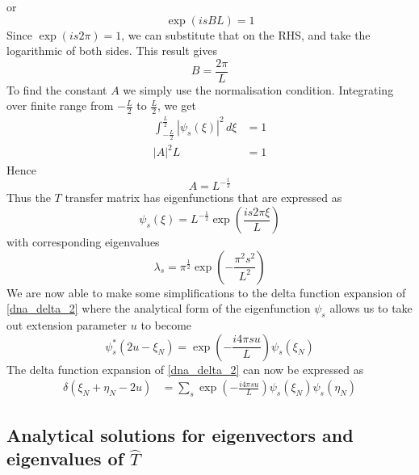 %
or
%
\begin{equation}
\exp\left(isBL\right)=1
\end{equation}
%
Since $\exp\left(is2\pi\right)=1$, we can substitute that on the RHS, and take the logarithmic of both sides. This result gives
%
\begin{equation}
\label{ana_s_sol_const_B}
B=\frac{2\pi}{L}
\end{equation}
%
To find the constant $A$ we simply use the normalisation condition. Integrating over finite range from $-\frac{L}{2}$ to $\frac{L}{2}$, we get
%
\begin{align}
\label{ana_s_sol_norm}
\int_{-\frac{L}{2}}^{\frac{L}{2}}|\psi_{s}\left(\xi\right)|^{2}\,d\xi&=1\\
|A|^{2}L&=1
\end{align}
%
Hence
\begin{equation}
\label{ana_s_sol_const_A}
A=L^{-\frac{1}{2}}
\end{equation}
%
Thus the $T$ transfer matrix has eigenfunctions that are expressed as
%
\begin{equation}
\label{dna_T_eigenfunction}
\psi_{s}\left(\xi\right)=L^{-\frac{1}{2}}\exp\left(\frac{i s 2\pi\xi}{L}\right)
\end{equation}
%
with corresponding eigenvalues
%
\begin{equation}
\label{dna_T_eigenvalue}
\lambda_{s}=\pi^{\frac{1}{2}}\exp\left(-\frac{\pi^{2} s^{2}}{L^{2}}\right)
\end{equation}
%
We are now able to make some simplifications to the delta function expansion of \eqref{dna_delta_2} where the analytical form of the eigenfunction $\psi_{s}$ allows us to take out extension parameter $u$ to become
%
\begin{equation}
\psi^{*}_{s}\left(2u-\xi_{N}\right)=\exp\left(-\frac{i4\pi s u}{L}\right)\psi_{s}\left(\xi_{N}\right)
\end{equation}
%
The delta function expansion of \eqref{dna_delta_2} can now be expressed as
%
\begin{align}
\label{dna_delta_2b}
\delta\left(\xi_{N}+\eta_{N}-2u\right)&=\sum_{s}\exp\left(-\frac{i4\pi s u}{L}\right)\psi_{s}\left(\xi_{N}\right)\psi_{s}\left(\eta_{N}\right)
\end{align}
%
\subsection{Analytical solutions for eigenvectors and eigenvalues of $\hat{T}$}

